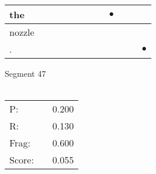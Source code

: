 \documentclass[landscape]{article}
\newcommand{\ssp}{\hspace{2pt}}
\newcommand{\mex}{\cellcolor{g}$\bullet$}
\begin{document}
\begin{tabular}{|l|p{10pt}|p{10pt}|p{10pt}|p{10pt}|p{10pt}|p{10pt}|p{10pt}|p{10pt}|p{10pt}|p{10pt}|p{10pt}|}
\hline
\ssp \cellcolor{ref7}the \ssp&\hspace{2pt}&\hspace{2pt}&\hspace{2pt}&\hspace{2pt}&\hspace{2pt}&\hspace{2pt}&\hspace{2pt}&\hspace{2pt}\mex&\hspace{2pt}&\hspace{2pt}&\hspace{2pt}\\
\hline
\ssp nozzle \ssp&\hspace{2pt}&\hspace{2pt}&\hspace{2pt}&\hspace{2pt}&\hspace{2pt}&\hspace{2pt}&\hspace{2pt}&\hspace{2pt}&\hspace{2pt}&\hspace{2pt}&\hspace{2pt}\\
\hline
\ssp \cellcolor{ref10}. \ssp&\hspace{2pt}&\hspace{2pt}&\hspace{2pt}&\hspace{2pt}&\hspace{2pt}&\hspace{2pt}&\hspace{2pt}&\hspace{2pt}&\hspace{2pt}&\hspace{2pt}&\hspace{2pt}\mex\\
\hline
\end{tabular}

\vspace{6pt}
\noindent Segment 47\\\\
\noindent\begin{tabular}{lm{12pt}r}
\hline
P:&&0.200\\
R:&&0.130\\
Frag:&&0.600\\
Score:&&0.055\\
\end{tabular}
\end{document}
